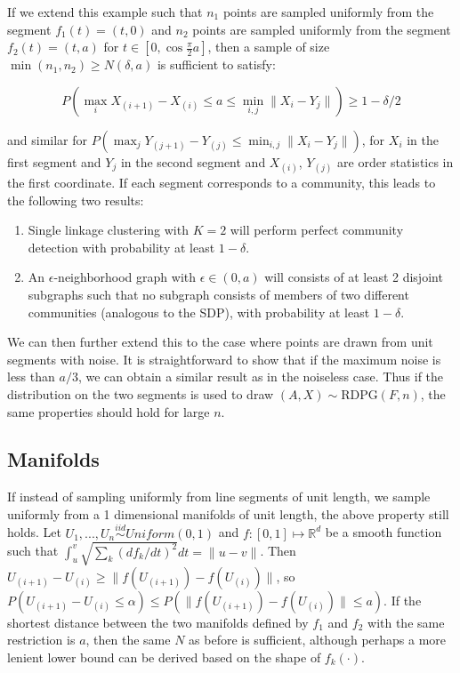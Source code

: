 \documentclass[
  11pt,
]{article}
\begin{document}
If we extend this example such that \(n_1\) points are sampled uniformly
from the segment \(f_1(t) = (t, 0)\) and \(n_2\) points are sampled
uniformly from the segment \(f_2(t) = (t, a)\) for
\(t \in [0, \cos \frac{\pi}{2} a]\), then a sample of size
\(\min(n_1, n_2) \geq N(\delta, a)\) is sufficient to satisfy:

\begin{equation}
P(\max_i X_{(i+1)} - X_{(i)} \leq a \leq \min_{i, j} \|X_i - Y_j\|) 
\geq 1 - \delta / 2
\end{equation}

and similar for
\(P(\max_j Y_{(j+1)} - Y_{(j)} \leq \min_{i, j} \|X_i - Y_j\|)\), for
\(X_i\) in the first segment and \(Y_j\) in the second segment and
\(X_{(i)}\), \(Y_{(j)}\) are order statistics in the first coordinate.
If each segment corresponds to a community, this leads to the following
two results:

\begin{enumerate}
\def\labelenumi{\arabic{enumi}.}
\item
  Single linkage clustering with \(K = 2\) will perform perfect
  community detection with probability at least \(1 - \delta\).
\item
  An \(\epsilon\)-neighborhood graph with \(\epsilon \in (0, a)\) will
  consists of at least 2 disjoint subgraphs such that no subgraph
  consists of members of two different communities (analogous to the
  SDP), with probability at least \(1 - \delta\).
\end{enumerate}

We can then further extend this to the case where points are drawn from
unit segments with noise. It is straightforward to show that if the
maximum noise is less than \(a / 3\), we can obtain a similar result as
in the noiseless case. Thus if the distribution on the two segments is
used to draw \((A, X) \sim \text{RDPG}(F, n)\), the same properties
should hold for large \(n\).

\hypertarget{manifolds}{%
\subsection{Manifolds}\label{manifolds}}

If instead of sampling uniformly from line segments of unit length, we
sample uniformly from a 1 dimensional manifolds of unit length, the
above property still holds. Let
\(U_1, ..., U_n \stackrel{iid}{\sim} Uniform(0, 1)\) and
\(f : [0, 1] \mapsto \mathbb{R}^d\) be a smooth function such that
\(\int_u^v \sqrt{\sum_k (df_k / dt)^2} dt = \|u - v\|\). Then
\(U_{(i+1)} - U_{(i)} \geq \|f(U_{(i+1)}) - f(U_{(i)})\|\), so
\(P(U_{(i+1)} - U_{(i)} \leq \alpha) \leq P(\|f(U_{(i+1)}) - f(U_{(i)})\| \leq a)\).
If the shortest distance between the two manifolds defined by \(f_1\)
and \(f_2\) with the same restriction is \(a\), then the same \(N\) as
before is sufficient, although perhaps a more lenient lower bound can be
derived based on the shape of \(f_k(\cdot)\).
\end{document}
